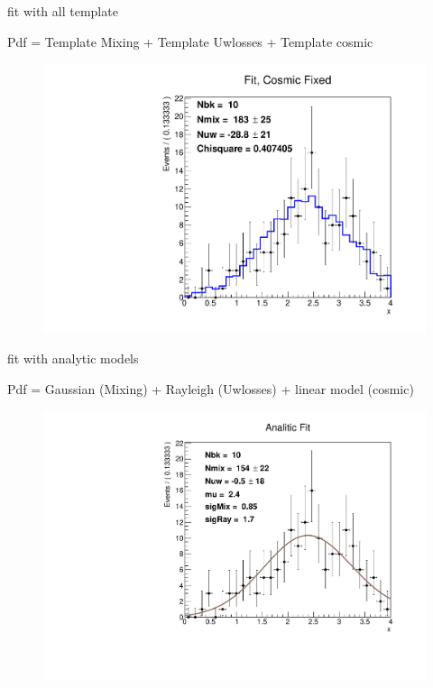 \documentclass[10pt]{beamer}
\begin{document}
\begin{frame}{fit with all template}

Pdf = Template Mixing + Template Uwlosses + Template cosmic

\begin{figure}[hbtp]
\centering
\includegraphics[width = 0.65 \textwidth]{FitTemplate.pdf}
\end{figure}
\end{frame}

\begin{frame}{fit with analytic models}

Pdf = Gaussian (Mixing) + Rayleigh (Uwlosses) + linear model (cosmic)

\begin{figure}[hbtp]
\centering
\includegraphics[width = 0.70 \textwidth]{TuttoAnalitico.pdf}
\end{figure}
\end{frame}
\end{document}
